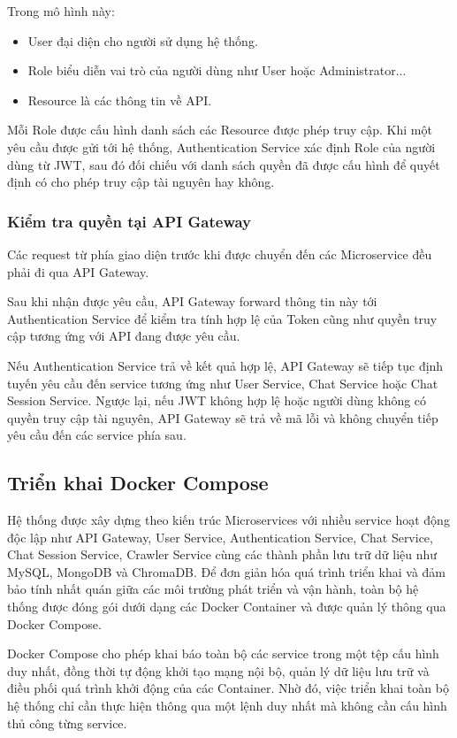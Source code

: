 \documentclass[../DoAn.tex]{subfiles}
\begin{document}
Trong mô hình này:
\begin{itemize}
    \item User đại diện cho người sử dụng hệ thống.
    \item Role biểu diễn vai trò của người dùng như User hoặc Administrator...
    \item Resource là các thông tin về API.
\end{itemize}

Mỗi Role được cấu hình danh sách các Resource được phép truy cập. Khi một yêu cầu được gửi tới hệ thống, Authentication Service xác định Role của người dùng từ JWT, sau đó đối chiếu với danh sách quyền đã được cấu hình để quyết định có cho phép truy cập tài nguyên hay không.

\subsubsection{Kiểm tra quyền tại API Gateway}
Các request từ phía giao diện trước khi được chuyển đến các Microservice đều phải đi qua API Gateway.

Sau khi nhận được yêu cầu, API Gateway forward  thông tin này tới Authentication Service để kiểm tra tính hợp lệ của Token cũng như quyền truy cập tương ứng với API đang được yêu cầu.

Nếu Authentication Service trả về kết quả hợp lệ, API Gateway sẽ tiếp tục định tuyến yêu cầu đến service tương ứng như User Service, Chat Service hoặc Chat Session Service. Ngược lại, nếu JWT không hợp lệ hoặc người dùng không có quyền truy cập tài nguyên, API Gateway sẽ trả về mã lỗi và không chuyển tiếp yêu cầu đến các service phía sau.

\subsection{Triển khai Docker Compose}
Hệ thống được xây dựng theo kiến trúc Microservices với nhiều service hoạt động độc lập như API Gateway, User Service, Authentication Service, Chat Service, Chat Session Service, Crawler Service cùng các thành phần lưu trữ dữ liệu như MySQL, MongoDB và ChromaDB. Để đơn giản hóa quá trình triển khai và đảm bảo tính nhất quán giữa các môi trường phát triển và vận hành, toàn bộ hệ thống được đóng gói dưới dạng các Docker Container và được quản lý thông qua Docker Compose.

Docker Compose cho phép khai báo toàn bộ các service trong một tệp cấu hình duy nhất, đồng thời tự động khởi tạo mạng nội bộ, quản lý dữ liệu lưu trữ và điều phối quá trình khởi động của các Container. Nhờ đó, việc triển khai toàn bộ hệ thống chỉ cần thực hiện thông qua một lệnh duy nhất mà không cần cấu hình thủ công từng service.
\end{document}
